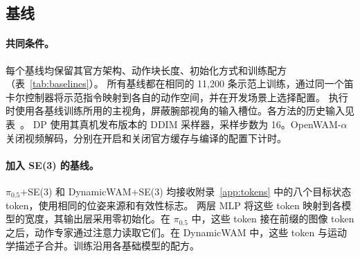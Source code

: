 \subsection{基线}
\label{app:baselines}

\paragraph{共同条件。}
每个基线均保留其官方架构、动作块长度、初始化方式和训练配方（表~\ref{tab:baselines}）。
所有基线都在相同的 11{,}200 条示范上训练，通过同一个笛卡尔控制器将示范指令映射到各自的动作空间，并在开发场景上选择配置。
执行时使用各基线训练所用的主视角，屏蔽腕部视角的输入槽位。各方法的历史输入见表~。
DP 使用其真机发布版本的 DDIM 采样器，采样步数为 16。OpenWAM-$\alpha$ 关闭视频解码，分别在开启和关闭官方缓存与编译的配置下计时。

\paragraph{加入 SE(3) 的基线。}
$\pi_{0.5}$+SE(3) 和 DynamicWAM+SE(3) 均接收附录~\ref{app:tokens} 中的八个目标状态 token，使用相同的位姿来源和有效性标志。
两层 MLP 将这些 token 映射到各模型的宽度，其输出层采用零初始化。在 $\pi_{0.5}$ 中，这些 token 接在前缀的图像 token 之后，动作专家通过注意力读取它们。在 DynamicWAM 中，这些 token 与运动学描述子合并。训练沿用各基础模型的配方。
